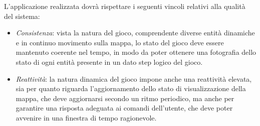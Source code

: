 L'applicazione realizzata dovrà rispettare i seguenti vincoli relativi alla qualità del sistema:
\begin{itemize}
	\item \textit{Consistenza}: vista la natura del gioco, comprendente diverse entità dinamiche e in continuo movimento sulla mappa, lo stato del gioco deve essere mantenuto coerente nel tempo, in modo da poter ottenere una fotografia dello stato di ogni entità presente in un dato step logico del gioco.
	\item \textit{Reattività}: la natura dinamica del gioco impone anche una reattività elevata, sia per quanto riguarda l'aggiornamento dello stato di visualizzazione della mappa, che deve aggiornarsi secondo un ritmo periodico, ma anche per garantire una risposta adeguata ai comandi dell'utente, che deve poter avvenire in una finestra di tempo ragionevole.
\end{itemize}